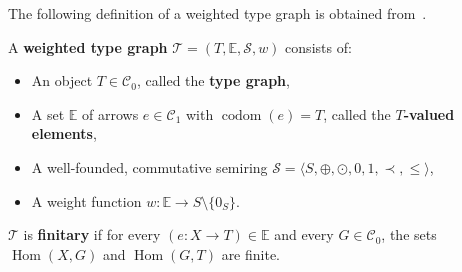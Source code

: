 The following definition of a weighted type graph is obtained from~\cite[\textdef~3.1]{endrullis2024generalized}.
\begin{definition}
    \label{def:weighted_type_graph}
    A \textbf{weighted type graph} \(\mathcal{T} = (T, \mathbb{E}, \mathcal{S}, w)\) consists of:
    \begin{itemize} 
        \item An object \(T \in \mathcal{C}_0\), called the \textbf{type graph},
        \item A set \(\mathbb{E}\) of arrows \(e \in \mathcal{C}_1\) with \(\operatorname{codom}(e) = T\), called the \textbf{\(T\)-valued elements},
        \item A well-founded, commutative semiring \(\mathcal{S}=\langle S, \oplus, \odot, 0, 1, \prec, \leq \rangle \),
        \item A weight function \(w : \mathbb{E} \to S \setminus \{0_S\}\).
    \end{itemize}
    \(\mathcal{T}\) is \textbf{finitary} if for every \((e:X \to T) \in \mathbb{E}\) and every \(G \in \mathcal{C}_0\), the sets \(\operatorname{Hom}(X, G)\) and \(\operatorname{Hom}(G, T)\) are finite.
\end{definition}
